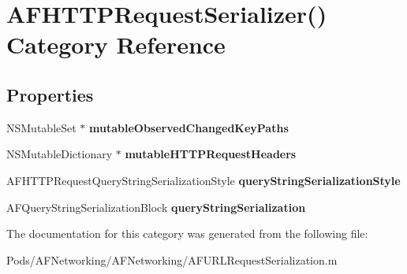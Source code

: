 \hypertarget{category_a_f_h_t_t_p_request_serializer_07_08}{}\section{A\+F\+H\+T\+T\+P\+Request\+Serializer() Category Reference}
\label{category_a_f_h_t_t_p_request_serializer_07_08}
\subsection*{Properties}
\begin{DoxyCompactItemize}
\item 
\mbox{\label{category_a_f_h_t_t_p_request_serializer_07_08_a6a2639f207d8a45968c3c7425b484e00}} 
N\+S\+Mutable\+Set $\ast$ {\bfseries mutable\+Observed\+Changed\+Key\+Paths}
\item 
\mbox{\label{category_a_f_h_t_t_p_request_serializer_07_08_a655ff64b4b2109962ff0808bf7e232ad}} 
N\+S\+Mutable\+Dictionary $\ast$ {\bfseries mutable\+H\+T\+T\+P\+Request\+Headers}
\item 
\mbox{\label{category_a_f_h_t_t_p_request_serializer_07_08_a62472cba41bf66900965ba97f3df4667}} 
A\+F\+H\+T\+T\+P\+Request\+Query\+String\+Serialization\+Style {\bfseries query\+String\+Serialization\+Style}
\item 
\mbox{\label{category_a_f_h_t_t_p_request_serializer_07_08_a76c33177f36c3fd1d97a264b4f3a15fe}} 
A\+F\+Query\+String\+Serialization\+Block {\bfseries query\+String\+Serialization}
\end{DoxyCompactItemize}


The documentation for this category was generated from the following file\+:\begin{DoxyCompactItemize}
\item 
Pods/\+A\+F\+Networking/\+A\+F\+Networking/A\+F\+U\+R\+L\+Request\+Serialization.\+m\end{DoxyCompactItemize}
